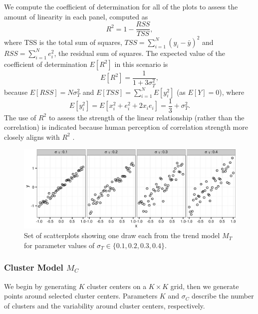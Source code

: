 \documentclass[11pt]{isuthesis}\usepackage[]{graphicx}\usepackage[]{color}
\newenvironment{knitrout}{}{} %
\begin{document}
We compute the coefficient of determination for all of the plots to assess the amount of linearity in each panel, computed as 
\begin{equation}\label{eq:linearMeasure}
R^2 = 1 - \frac{RSS}{TSS},
\end{equation}
where TSS is the total sum of squares, $TSS = \sum_{i=1}^N \left(y_i - \bar{y}\right)^2$ and $RSS = \sum_{i=1}^N e_i^2$, the residual sum of squares.
The expected value of the coefficient of determination $E\left[R^2\right]$ in this scenario is 
\[
E\left[R^2\right] =  \frac{1}{1 + 3\sigma^2_T},
\]
because
$E[RSS] = N\sigma^2_T$ and $E[TSS] = \sum_{i=1}^N E\left[y_i^2\right]$  (as $E[Y] = 0$), where 
$$
E\left[y_i^2\right] = E\left[x_i^2 + e_i^2 + 2 x_ie_i\right] = \frac{1}{3} + \sigma^2_T. 
$$
The use of $R^2$ to assess the strength of the linear relationship (rather than the correlation) is indicated because human perception of correlation strength more closely aligns with $R^2$ \citep{bobko1979perception,lewandowsky1989perception}. 

\begin{figure}[ht]
\begin{knitrout}
\color{fgcolor}

{\centering \includegraphics[width=\linewidth]{Figure/FeatureHierarchy/fig-trends-1} 

}



\end{knitrout}
\caption[Parameters affecting $M_T$]{\label{fig:trends} Set of scatterplots showing one draw each from the trend model $M_T$ for parameter values of  $\sigma_T \in \{0.1, 0.2, 0.3, 0.4\}$.}
\end{figure}

\subsubsection{Cluster Model $M_C$} 
We begin by generating $K$ cluster centers on a $K \times K$ grid, then we generate points around selected cluster centers. Parameters $K$ and $\sigma_C$ describe the number of clusters and the variability around cluster centers, respectively. 
\end{document}
